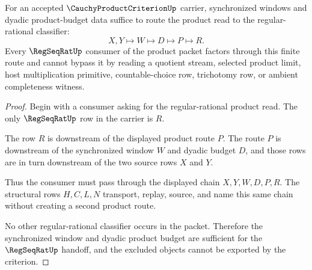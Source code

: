 \begin{theorem}
\label{thm:cauchy-product-criterion-window-budget-sufficiency}
For an accepted $\CauchyProductCriterionUp$ carrier, synchronized windows and dyadic product-budget data suffice to route the product read to the regular-rational classifier:
$$
X,Y\longmapsto W\longmapsto D\longmapsto P\longmapsto R .
$$
Every $\RegSeqRatUp$ consumer of the product packet factors through this finite route and cannot bypass it by reading a quotient stream, selected product limit, host multiplication primitive, countable-choice row, trichotomy row, or ambient completeness witness.
\end{theorem}
\begin{proof}
Begin with a consumer asking for the regular-rational product read. The only $\RegSeqRatUp$ row in the carrier is $R$.

The row $R$ is downstream of the displayed product route $P$. The route $P$ is downstream of the synchronized window $W$ and dyadic budget $D$, and those rows are in turn downstream of the two source rows $X$ and $Y$.

Thus the consumer must pass through the displayed chain $X,Y,W,D,P,R$. The structural rows $H,C,L,N$ transport, replay, source, and name this same chain without creating a second product route.

No other regular-rational classifier occurs in the packet. Therefore the synchronized window and dyadic product budget are sufficient for the $\RegSeqRatUp$ handoff, and the excluded objects cannot be exported by the criterion.
\end{proof}

